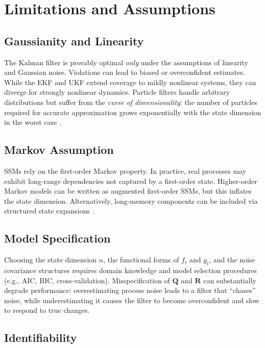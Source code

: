 \documentclass[conference]{IEEEtran}
\begin{document}
\section{Limitations and Assumptions}
\label{sec:limitations}

\subsection{Gaussianity and Linearity}

The Kalman filter is provably optimal \emph{only} under the assumptions of linearity and Gaussian noise. Violations can lead to biased or overconfident estimates. While the EKF and UKF extend coverage to mildly nonlinear systems, they can diverge for strongly nonlinear dynamics. Particle filters handle arbitrary distributions but suffer from the \emph{curse of dimensionality}: the number of particles required for accurate approximation grows exponentially with the state dimension in the worst case \cite{bengtsson2008curse}.

\subsection{Markov Assumption}

SSMs rely on the first-order Markov property. In practice, real processes may exhibit long-range dependencies not captured by a first-order state. Higher-order Markov models can be written as augmented first-order SSMs, but this inflates the state dimension. Alternatively, long-memory components can be included via structured state expansions \cite{gu2021efficiently}.

\subsection{Model Specification}

Choosing the state dimension $n$, the functional forms of $f_t$ and $g_t$, and the noise covariance structures requires domain knowledge and model selection procedures (e.g., AIC, BIC, cross-validation). Misspecification of $\mathbf{Q}$ and $\mathbf{R}$ can substantially degrade performance: overestimating process noise leads to a filter that ``chases'' noise, while underestimating it causes the filter to become overconfident and slow to respond to true changes.

\subsection{Identifiability}
\end{document}
